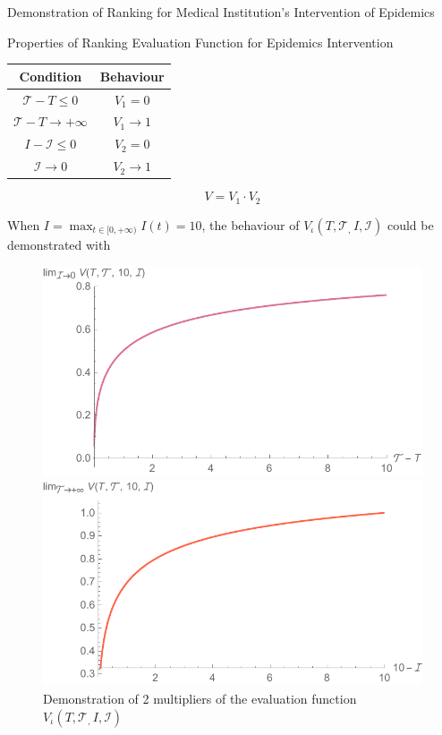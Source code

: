 \documentclass[8pt, hyperref={colorlinks=true}]{beamer}
\begin{document}
\begin{frame}{Demonstration of Ranking for Medical Institution's Intervention of Epidemics}
\begin{block}{Properties of Ranking Evaluation Function for Epidemics Intervention}
\centering
\begin{tabular}{c|c}
    Condition & Behaviour \\\hline
    $\mathcal{T}-T\leq0$ & $V_1=0$ \\\hline
    $\mathcal{T}-T\to+\infty$ & $V_1\to1$ \\\hline
    $I-\mathcal{I}\leq0$ & $V_2=0$ \\\hline
    $\mathcal{I}\to0$ & $V_2\to1$
\end{tabular}
\[
V=V_1\cdot V_2
\]
\end{block}

When $\displaystyle{I=\max_{t\in[0,+\infty)}I(t)=10}$, the behaviour of $V_\iota\left(T,\mathcal{T}_,\,I,\mathcal{I}\right)$ could be demonstrated with

\begin{figure}[htbp]
    \centering
    \begin{minipage}[t]{0.5\textwidth}
        \centering
        \includegraphics[width=\textwidth]{EvalFuncMSIR1.pdf} %
    \end{minipage}\hfill
    \begin{minipage}[t]{0.5\textwidth}
        \centering
        \includegraphics[width=\textwidth]{EvalFuncMSIR2.pdf} %
    \end{minipage}
    \caption{Demonstration of 2 multipliers of the evaluation function $V_\iota\left(T,\mathcal{T}_,\,I,\mathcal{I}\right)$}
    \label{fig:msir_eval_func_plot}
\end{figure}
\end{frame}
\end{document}
